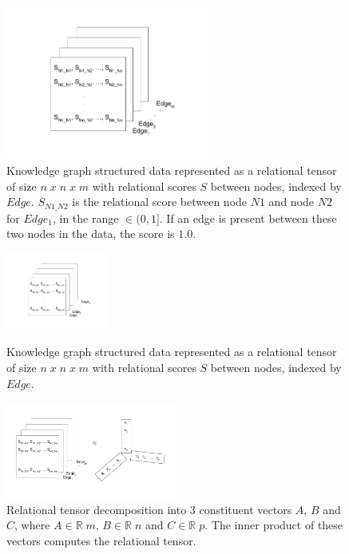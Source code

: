 \begin{figure}[H]
   	\centering
    	\includegraphics[width=0.6\textwidth, height=0.3\textheight]{relational_tensor.png}
	\captionsetup{justification=centering}
	\caption{Knowledge graph structured data represented as a relational tensor of size $ n \; x \; n \; x \; m $ with relational scores $ S $ between nodes, indexed by $ Edge $. $ S_{N1\_N2} $ is the relational score between node $ N1 $ and node $ N2 $ for $ Edge_1 $, in the range $ \in (0, 1] $. If an edge is present between these two nodes in the data, the score is $ 1.0 $.}
\end{figure}

\begin{figure}[H]
	\parbox{.4\linewidth}{
   		\centering
    		\includegraphics[width=0.3\textwidth, height=0.3\textwidth]{relational_tensor.png}
		\captionsetup{justification=centering}
		\caption{Knowledge graph structured data represented as a relational tensor of size $ n \; x \; n \; x \; m $ with relational scores $ S $ between nodes, indexed by $ Edge $.}
	}
	\hfill
	\parbox{.6\linewidth}{
   		\centering
    		\includegraphics[width=0.5\textwidth, height=0.4\textwidth]{relational_tensor_decomposition}
		\captionsetup{justification=centering}
		\caption{Relational tensor decomposition into $ 3 $ constituent vectors $ A $, $ B $ and $ C $, where $ A \in \mathbb{R} \; m $,  $ B \in \mathbb{R} \; n $ and $ C \in \mathbb{R} \; p $. The inner product of these vectors computes the relational tensor.}
	}
\end{figure}

